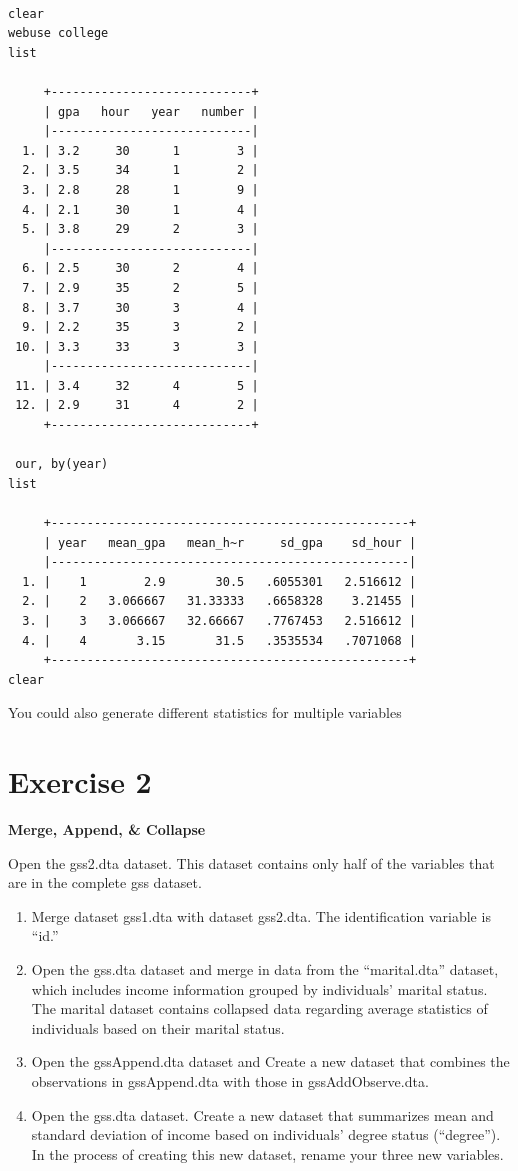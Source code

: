 \documentclass[]{book}
\providecommand{\tightlist}{%
  \setlength{\itemsep}{0pt}\setlength{\parskip}{0pt}}
\begin{document}
\begin{verbatim}

clear
webuse college
list

     +----------------------------+
     | gpa   hour   year   number |
     |----------------------------|
  1. | 3.2     30      1        3 |
  2. | 3.5     34      1        2 |
  3. | 2.8     28      1        9 |
  4. | 2.1     30      1        4 |
  5. | 3.8     29      2        3 |
     |----------------------------|
  6. | 2.5     30      2        4 |
  7. | 2.9     35      2        5 |
  8. | 3.7     30      3        4 |
  9. | 2.2     35      3        2 |
 10. | 3.3     33      3        3 |
     |----------------------------|
 11. | 3.4     32      4        5 |
 12. | 2.9     31      4        2 |
     +----------------------------+

 our, by(year)
list

     +--------------------------------------------------+
     | year   mean_gpa   mean_h~r     sd_gpa    sd_hour |
     |--------------------------------------------------|
  1. |    1        2.9       30.5   .6055301   2.516612 |
  2. |    2   3.066667   31.33333   .6658328    3.21455 |
  3. |    3   3.066667   32.66667   .7767453   2.516612 |
  4. |    4       3.15       31.5   .3535534   .7071068 |
     +--------------------------------------------------+
clear
\end{verbatim}

You could also generate different statistics for multiple variables

\hypertarget{exercise-2-5}{%
\section{Exercise 2}\label{exercise-2-5}}

\textbf{Merge, Append, \& Collapse}

Open the gss2.dta dataset. This dataset contains only half of the variables that are in the complete gss dataset.

\begin{enumerate}
\def\labelenumi{\arabic{enumi}.}
\tightlist
\item
  Merge dataset gss1.dta with dataset gss2.dta. The identification variable is ``id.''
\item
  Open the gss.dta dataset and merge in data from the ``marital.dta'' dataset, which includes income information grouped by individuals' marital status. The marital dataset contains collapsed data regarding average statistics of individuals based on their marital status.
\item
  Open the gssAppend.dta dataset and Create a new dataset that combines the observations in gssAppend.dta with those in gssAddObserve.dta.
\item
  Open the gss.dta dataset. Create a new dataset that summarizes mean and standard deviation of income based on individuals' degree status (``degree''). In the process of creating this new dataset, rename your three new variables.
\end{enumerate}
\end{document}
